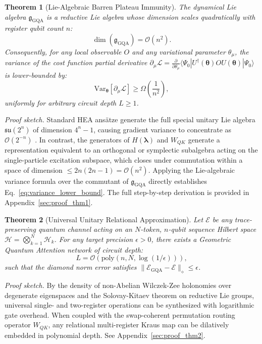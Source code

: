 \documentclass{article}
\newtheorem{theorem}{Theorem}
\begin{document}
\begin{theorem}[Lie-Algebraic Barren Plateau Immunity]
\label{thm:barren_plateau_immunity}
The dynamical Lie algebra $\mathfrak{g}_{\mathrm{GQA}}$ is a reductive Lie algebra whose dimension scales quadratically with register qubit count $n$:
\begin{equation}
\dim(\mathfrak{g}_{\mathrm{GQA}}) = \mathcal{O}(n^2).
\label{eq:dla_dim}
\end{equation}
Consequently, for any local observable $O$ and any variational parameter $\theta_\mu$, the variance of the cost function partial derivative $\partial_\mu \mathcal{L} = \frac{\partial}{\partial \theta_\mu} \langle \Psi_0 | U^\dagger(\boldsymbol{\theta}) O U(\boldsymbol{\theta}) | \Psi_0 \rangle$ is lower-bounded by:
\begin{equation}
\mathrm{Var}_{\boldsymbol{\theta}}[\partial_\mu \mathcal{L}] \ge \Omega\left(\frac{1}{n^2}\right),
\label{eq:variance_lower_bound}
\end{equation}
uniformly for arbitrary circuit depth $L \ge 1$.
\end{theorem}
\emph{Proof sketch.} Standard HEA ans\"atze generate the full special unitary Lie algebra $\mathfrak{su}(2^n)$ of dimension $4^n - 1$, causing gradient variance to concentrate as $\mathcal{O}(2^{-n})$ \citep{Larocca2024BarrenPlateaus}. In contrast, the generators of $H(\boldsymbol{\lambda})$ and $W_{QK}$ generate a representation equivalent to an orthogonal or symplectic subalgebra acting on the single-particle excitation subspace, which closes under commutation within a space of dimension $\le 2n(2n-1) = \mathcal{O}(n^2)$. Applying the Lie-algebraic variance formula over the commutant of $\mathfrak{g}_{\mathrm{GQA}}$ directly establishes Eq.~\eqref{eq:variance_lower_bound}. The full step-by-step derivation is provided in Appendix~\ref{sec:proof_thm1}.

\begin{theorem}[Universal Unitary Relational Approximation]
\label{thm:universal_approximation}
Let $\mathcal{E}$ be any trace-preserving quantum channel acting on an $N$-token, $n$-qubit sequence Hilbert space $\mathcal{H} = \bigotimes_{k=1}^N \mathcal{H}_k$. For any target precision $\epsilon > 0$, there exists a Geometric Quantum Attention network of circuit depth:
\begin{equation}
L = \mathcal{O}\left( \mathrm{poly}(n, N, \log(1/\epsilon)) \right),
\label{eq:expressivity_depth}
\end{equation}
such that the diamond norm error satisfies $\|\mathcal{E}_{\mathrm{GQA}} - \mathcal{E}\|_\diamond \le \epsilon$.
\end{theorem}
\emph{Proof sketch.} By the density of non-Abelian Wilczek-Zee holonomies over degenerate eigenspaces and the Solovay-Kitaev theorem on reductive Lie groups, universal single- and two-register operations can be synthesized with logarithmic gate overhead. When coupled with the swap-coherent permutation routing operator $W_{QK}$, any relational multi-register Kraus map can be dilatively embedded in polynomial depth. See Appendix~\ref{sec:proof_thm2}.
\end{document}
